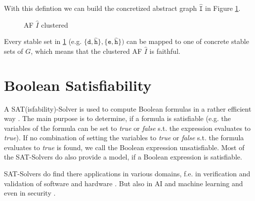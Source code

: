 With this defintion we can build the concretized abstract graph $\mathtt{\hat{I}}$ in Figure \ref{af:backgroundClusterExample3}.


\begin{figure}[h]
    \centering
    \caption{\ac{AF} $\hat{I}$ clustered}
    \label{af:backgroundClusterExample3}
\end{figure}

Every stable set in \ref{af:backgroundClusterExample3} (e.g. $\mathtt{\{d, \hat{h}\}, \{e, \hat{h}\}})$ can be mapped to one of concrete stable sets of $G$, which means that the clustered AF $\hat{I}$ is faithful.


\section{Boolean Satisfiability}
\label{sec:BooleanSatisfiability}

A SAT(isfability)-Solver is used to compute Boolean formulas in a rather efficient way \cite{Biere2009}. The main purpose is to determine, if a formula is satisfiable (e.g. the variables of the formula can be set to \textit{true} or \textit{false} s.t. the expression evaluates to \textit{true}). If no combination of setting the variables to \textit{true} or \textit{false} s.t. the formula evaluates to \textit{true} is found, we call the Boolean expression unsatisfiable. Most of the SAT-Solvers do also provide a model, if a Boolean expression is satisfiable.

SAT-Solvers do find there applications in various domains, f.e. in verification and validation of software and hardware \cite{DBLP:conf/dagstuhl/Gogolla09, DBLP:books/daglib/0045943}. But also in AI and machine learning \cite{DBLP:phd/basesearch/Liang18a} and even in security \cite{Pasero2022-SATHashFunctions-Repo, DBLP:journals/iacr/LinYXTS24}.

